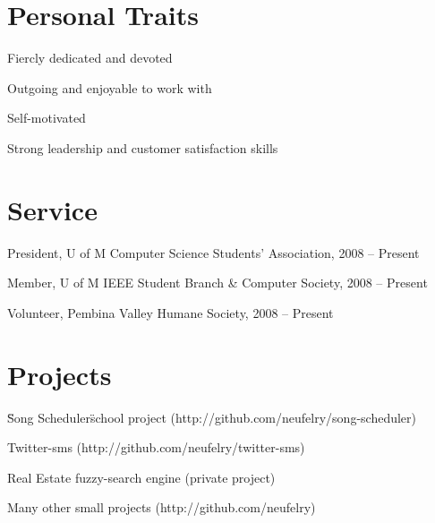 \documentclass[margin,line,letterpaper]{resume}
\begin{document}
\begin{resume}
  \section{\mysidestyle Personal Traits}

  \begin{list2}
    \item Fiercly dedicated and devoted
    \item Outgoing and enjoyable to work with
    \item Self-motivated
    \item Strong leadership and customer satisfaction skills
  \end{list2}

  \section{\mysidestyle Service}

  \begin{list2}
    \item President, U of M Computer Science Students' Association, 2008 -- Present
    \item Member, U of M IEEE Student Branch \& Computer Society, 2008 -- Present
    \item Volunteer, Pembina Valley Humane Society, 2008 -- Present
  \end{list2}

  \newpage
  \section{\mysidestyle Projects}

  \begin{list2}
    \item \"Song Scheduler\" school project (http://github.com/neufelry/song-scheduler)    
    \item Twitter-sms (http://github.com/neufelry/twitter-sms)
    \item Real Estate fuzzy-search engine (private project)
    \item Many other small projects (http://github.com/neufelry)
  \end{list2}



\end{resume}
\end{document}
